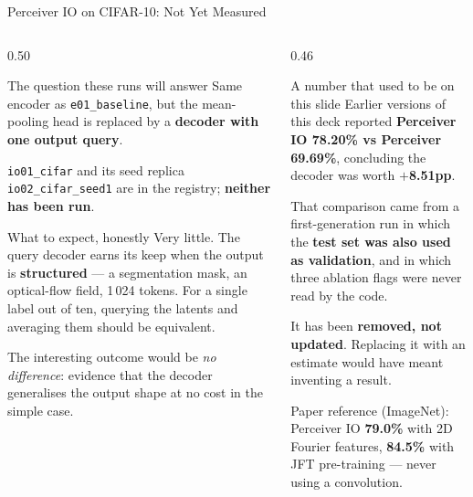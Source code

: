 \documentclass[aspectratio=169,11pt]{beamer}
\begin{document}
\begin{frame}[shrink=5]{Perceiver IO on CIFAR-10: Not Yet Measured}
  \begin{columns}[T]
    \begin{column}{0.50\textwidth}
      \begin{block}{The question these runs will answer}
        \small
        Same encoder as \texttt{e01\_baseline}, but the mean-pooling head is replaced by a \textbf{decoder with one output query}.

        \vspace{0.4em}
        \texttt{io01\_cifar} and its seed replica \texttt{io02\_cifar\_seed1} are in the registry; \textbf{neither has been run}.
      \end{block}

      \vspace{0.3em}
      \begin{block}{What to expect, honestly}
        \small
        Very little. The query decoder earns its keep when the output is \textbf{structured} --- a segmentation mask, an optical-flow field, 1\,024 tokens. For a single label out of ten, querying the latents and averaging them should be equivalent.

        \vspace{0.3em}
        The interesting outcome would be \emph{no difference}: evidence that the decoder generalises the output shape at no cost in the simple case.
      \end{block}
    \end{column}
    \begin{column}{0.46\textwidth}
      \begin{alertblock}{A number that used to be on this slide}
        \small
        Earlier versions of this deck reported \textbf{Perceiver IO 78.20\% vs Perceiver 69.69\%}, concluding the decoder was worth \textbf{$+$8.51pp}.

        \vspace{0.4em}
        That comparison came from a first-generation run in which the \textbf{test set was also used as validation}, and in which three ablation flags were never read by the code.

        \vspace{0.4em}
        It has been \textbf{removed, not updated}. Replacing it with an estimate would have meant inventing a result.
      \end{alertblock}

      \vspace{0.3em}
      \scriptsize Paper reference (ImageNet): Perceiver IO \textbf{79.0\%} with 2D Fourier features, \textbf{84.5\%} with JFT pre-training --- never using a convolution.
    \end{column}
  \end{columns}
\end{frame}
\end{document}
